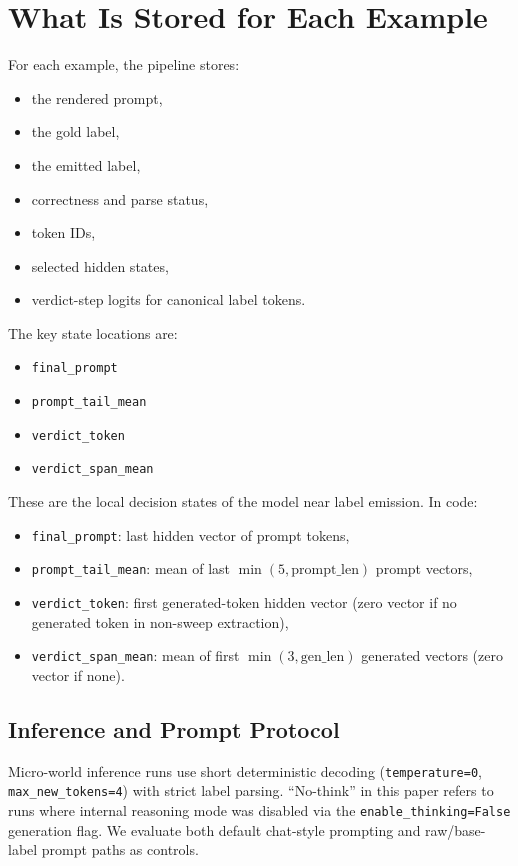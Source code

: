 \documentclass[11pt]{article}
\begin{document}
\section{What Is Stored for Each Example}
For each example, the pipeline stores:
\begin{itemize}
  \item the rendered prompt,
  \item the gold label,
  \item the emitted label,
  \item correctness and parse status,
  \item token IDs,
  \item selected hidden states,
  \item verdict-step logits for canonical label tokens.
\end{itemize}

The key state locations are:
\begin{itemize}
  \item \texttt{final\_prompt}
  \item \texttt{prompt\_tail\_mean}
  \item \texttt{verdict\_token}
  \item \texttt{verdict\_span\_mean}
\end{itemize}

These are the local decision states of the model near label emission.
In code:
\begin{itemize}
  \item \texttt{final\_prompt}: last hidden vector of prompt tokens,
  \item \texttt{prompt\_tail\_mean}: mean of last \(\min(5,\text{prompt\_len})\) prompt vectors,
  \item \texttt{verdict\_token}: first generated-token hidden vector (zero vector if no generated token in non-sweep extraction),
  \item \texttt{verdict\_span\_mean}: mean of first \(\min(3,\text{gen\_len})\) generated vectors (zero vector if none).
\end{itemize}

\subsection{Inference and Prompt Protocol}
Micro-world inference runs use short deterministic decoding (\texttt{temperature=0}, \texttt{max\_new\_tokens=4}) with strict label parsing.
``No-think'' in this paper refers to runs where internal reasoning mode was disabled via the \texttt{enable\_thinking=False} generation flag.
We evaluate both default chat-style prompting and raw/base-label prompt paths as controls.
\end{document}
